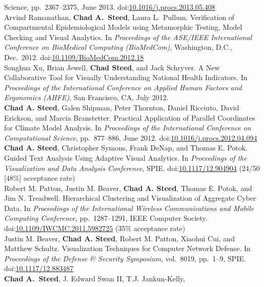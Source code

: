 \documentclass[11pt, letterpaper]{article}
\newcommand{\amper}{{\fontspec[Scale=.95]{Hoefler Text}\selectfont\itshape\&}}
\newcommand{\years}[1]{\marginnote{\scriptsize #1}}
\begin{document}
\begin{sloppypar}
{Science}, pp.\ 2367--2375, June 2013.
doi:\href{http://dx.doi.org/10.1016/j.procs.2013.05.408}{10.1016/j.procs.2013.05.408} \\
\years{2012}Arvind Ramanathan, \textbf{Chad A.\ Steed}, Laura L.\ Pullum.
Verification of Compartmental Epidemiological Models using Metamorphic Testing,
Model Checking and Visual Analytics. In \emph{Proceedings of the ASE/IEEE International
Conference on BioMedical Computing (BioMedCom)}, Washington, D.C., Dec.\ 2012.
doi:\href{http://dx.doi.org/10.1109/BioMedCom.2012.18}{10.1109/BioMedCom.2012.18} \\
\years{2012}Songhua Xu, Brian Jewell, \textbf{Chad Steed},
and Jack Schryver. A New Collaborative Tool for Visually Understanding
National Health Indicators. In \emph{Proceedings of the International
Conference on Applied Human Factors and Ergonomics (AHFE)}, San Francisco, CA,
July 2012.\\
\years{2012}\textbf{Chad A. Steed}, Galen Shipman, Peter Thornton, Daniel Ricciuto,
David Erickson, and Marcia Branstetter.  Practical Application of Parallel Coordinates for
Climate Model Analysis. In \emph{Proceedings of the International Conference on Computational
Science}, pp.\ 877--886, June 2012.
doi:\href{http://dx.doi.org/10.1016/j.procs.2012.04.094}
{10.1016/j.procs.2012.04.094} \\
\years{2012}\textbf{Chad A. Steed}, Christopher Symons, Frank DeNap, and
Thomas E. Potok. Guided Text Analysis Using Adaptive Visual Analytics. In
\emph{Proceedings of the Visualization and Data Analysis Conference}, SPIE.
doi:\href{http://dx.doi.org/10.1117/12.904904}{10.1117/12.904904} (24/50 [48\%] acceptance rate)\\
\years{2011}Robert M. Patton, Justin M. Beaver, \textbf{Chad A. Steed},
Thomas E. Potok, and Jim N. Treadwell. Hierarchical Clustering and
Visualization of Aggregate Cyber Data. In \emph{Proceedings of the International
Wireless Communications and Mobile Computing Conference}, pp.\ 1287--1291,
IEEE Computer Society. doi:\href{http://dx.doi.org/10.1109/IWCMC.2011.5982725}
{10.1109/IWCMC.2011.5982725} (35\% acceptance rate)\\
\years{2011}Justin M. Beaver, \textbf{Chad A. Steed}, Robert M. Patton,
Xiaohui Cui, and Matthew Schultz. Visualization Techniques for Computer
Network Defense. In \emph{Proceedings of the Defense \amper{} Security
Symposium}, vol.\ 8019, pp.\ 1--9, SPIE.
doi:\href{http://dx.doi.org/10.1117/12.883487} {10.1117/12.883487}\\
\years{2009}\textbf{Chad A.~Steed}, J. Edward Swan II, T.J. Jankun-Kelly,

\end{sloppypar}
\end{document}
